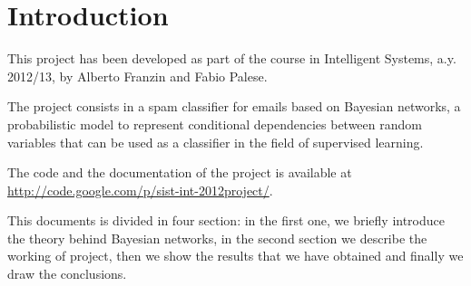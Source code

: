 \section{Introduction}
This project has been developed as part of the course in Intelligent Systems, a.y. 2012/13, by Alberto Franzin and Fabio Palese.

The project consists in a spam classifier for emails based on Bayesian networks, a probabilistic model to represent conditional dependencies between random variables that can be used as a classifier in the field of supervised learning.

The code and the documentation of the project is available at\\ \url{http://code.google.com/p/sist-int-2012project/}.

This documents is divided in four section: in the first one, we briefly introduce the theory behind Bayesian networks, in the second section we describe the working of project, then we show the results that we have obtained and finally we draw the conclusions.
